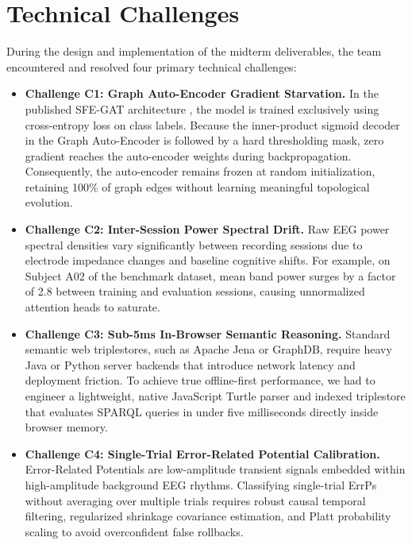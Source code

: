 \documentclass[12pt,a4paper]{report}
\begin{document}
\section{Technical Challenges}
During the design and implementation of the midterm deliverables, the team encountered and resolved four primary technical challenges:
\begin{itemize}[leftmargin=1.5em]
    \item \textbf{Challenge C1: Graph Auto-Encoder Gradient Starvation.} In the published SFE-GAT architecture \cite{gao2026sfegat}, the model is trained exclusively using cross-entropy loss on class labels. Because the inner-product sigmoid decoder in the Graph Auto-Encoder is followed by a hard thresholding mask, zero gradient reaches the auto-encoder weights during backpropagation. Consequently, the auto-encoder remains frozen at random initialization, retaining 100\% of graph edges without learning meaningful topological evolution.
    \item \textbf{Challenge C2: Inter-Session Power Spectral Drift.} Raw EEG power spectral densities vary significantly between recording sessions due to electrode impedance changes and baseline cognitive shifts. For example, on Subject A02 of the benchmark dataset, mean band power surges by a factor of 2.8 between training and evaluation sessions, causing unnormalized attention heads to saturate.
    \item \textbf{Challenge C3: Sub-5ms In-Browser Semantic Reasoning.} Standard semantic web triplestores, such as Apache Jena or GraphDB, require heavy Java or Python server backends that introduce network latency and deployment friction. To achieve true offline-first performance, we had to engineer a lightweight, native JavaScript Turtle parser and indexed triplestore that evaluates SPARQL queries in under five milliseconds directly inside browser memory.
    \item \textbf{Challenge C4: Single-Trial Error-Related Potential Calibration.} Error-Related Potentials are low-amplitude transient signals embedded within high-amplitude background EEG rhythms. Classifying single-trial ErrPs without averaging over multiple trials requires robust causal temporal filtering, regularized shrinkage covariance estimation, and Platt probability scaling to avoid overconfident false rollbacks.
\end{itemize}
\end{document}
